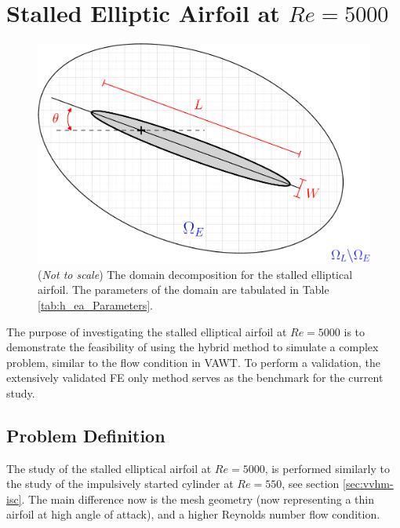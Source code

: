 
\section{Stalled Elliptic Airfoil at $Re=5000$}
\label{sec:vvhm-ea}

	\begin{figure}[!b]
	\centering
	\includegraphics[width=0.6\linewidth]{./figures/validation/ellipse/hellipticAirfoil_dd-crop.pdf}
	\caption{(\textit{Not to scale}) The domain decomposition for the stalled elliptical airfoil. The parameters of the domain are tabulated in Table \ref{tab:h_ea_Parameters}.}
	\label{fig:hellipticAirfoil_dd-crop}
	\end{figure}

The purpose of investigating the stalled elliptical airfoil at $Re=5000$ is to demonstrate the feasibility of using the hybrid method to simulate a complex problem, similar to the flow condition in VAWT. To perform a validation, the extensively validated FE only method serves as the benchmark for the current study.

\subsection{Problem Definition}

The study of the stalled elliptical airfoil at $Re=5000$, is performed similarly to the study of the impulsively started cylinder at $Re=550$, see section \ref{sec:vvhm-isc}. The main difference now is the mesh geometry (now representing a thin airfoil at high angle of attack), and a higher Reynolds number flow condition.

